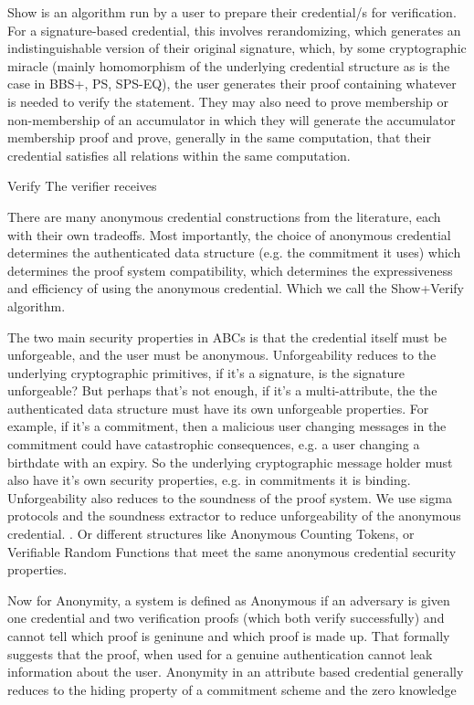 Show is an algorithm run by a user to prepare their credential/s for verification. For a signature-based credential, this involves rerandomizing, which generates an indistinguishable version of their original signature, which, by some cryptographic miracle (mainly homomorphism of the underlying credential structure as is the case in BBS+, PS, SPS-EQ), the user generates their proof containing whatever is needed to verify the statement. They may also need to prove membership or non-membership of an accumulator in which they will generate the accumulator membership proof and prove, generally in the same computation, that their credential satisfies all relations within the same computation. 

Verify
The verifier receives 



There are many anonymous credential constructions from the literature, each with their own tradeoffs. Most importantly, the choice of anonymous credential determines the authenticated data structure (e.g. the commitment it uses) which determines the proof system compatibility, which determines the expressiveness and efficiency of using the anonymous credential. Which we call the Show+Verify algorithm. 

The two main security properties in ABCs is that the credential itself must be unforgeable, and the user must be anonymous. 
Unforgeability reduces to the underlying cryptographic primitives, if it's a signature, is the signature unforgeable? But perhaps that's not enough, if it's a multi-attribute, the the authenticated data structure must have its own unforgeable properties. For example, if it's a commitment, then a malicious user changing messages in the commitment could have catastrophic consequences, e.g. a user changing a birthdate with an expiry. So the underlying cryptographic message holder must also have it's own security properties, e.g. in commitments it is binding. Unforgeability also reduces to the soundness of the proof system. We use sigma protocols and the soundness extractor to reduce unforgeability of the anonymous credential. . Or different structures like Anonymous Counting Tokens, or Verifiable Random Functions that meet the same anonymous credential security properties.

Now for Anonymity, a system is defined as Anonymous if an adversary is given one credential and two verification proofs (which both verify successfully) and cannot tell which proof is geninune and which proof is made up. That formally suggests that the proof, when used for a genuine authentication cannot leak information about the user. Anonymity in an attribute based credential generally reduces to the hiding property of a commitment scheme and the zero knowledge 



